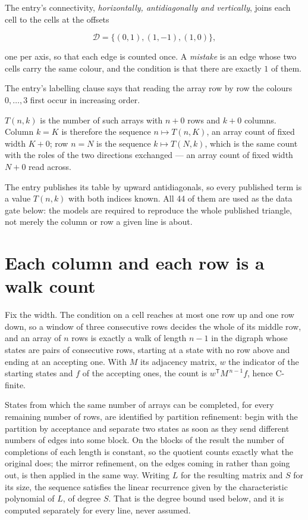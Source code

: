 \documentclass[11pt]{article}
\theoremstyle{definition}
\begin{document}
The entry's connectivity, {\itshape horizontally, antidiagonally and vertically}, joins each cell to the cells at the offsets

\[\mathcal{D} = \{(0,1), (1,-1), (1,0)\},\]

one per axis, so that each edge is counted once. A {\itshape mistake} is an edge whose two cells carry the same colour, and the condition is that there are exactly $1$ of them.

The entry's labelling clause says that reading the array row by row the colours $0,\dots,3$ first occur in increasing order.

$T(n,k)$ is the number of such arrays with $n + 0$ rows and $k + 0$ columns. Column $k = K$ is therefore the sequence $n \mapsto T(n,K)$, an array count of fixed width $K + 0$; row $n = N$ is the sequence $k \mapsto T(N,k)$, which is the same count with the roles of the two directions exchanged --- an array count of fixed width $N + 0$ read across.

The entry publishes its table by upward antidiagonals, so every published term is a value $T(n,k)$ with both indices known. All 44 of them are used as the data gate below: the models are required to reproduce the whole published triangle, not merely the column or row a given line is about.

\section{Each column and each row is a walk count}

Fix the width. The condition on a cell reaches at most one row up and one row down, so a window of three consecutive rows decides the whole of its middle row, and an array of $n$ rows is exactly a walk of length $n-1$ in the digraph whose states are pairs of consecutive rows, starting at a state with no row above and ending at an accepting one. With $M$ its adjacency matrix, $w$ the indicator of the starting states and $f$ of the accepting ones, the count is $w^{\mathsf T}M^{\,n-1}f$, hence C-finite.

States from which the same number of arrays can be completed, for every remaining number of rows, are identified by partition refinement: begin with the partition by acceptance and separate two states as soon as they send different numbers of edges into some block. On the blocks of the result the number of completions of each length is constant, so the quotient counts exactly what the original does; the mirror refinement, on the edges coming in rather than going out, is then applied in the same way. Writing $L$ for the resulting matrix and $S$ for its size, the sequence satisfies the linear recurrence given by the characteristic polynomial of $L$, of degree $S$. That is the degree bound used below, and it is computed separately for every line, never assumed.
\end{document}
